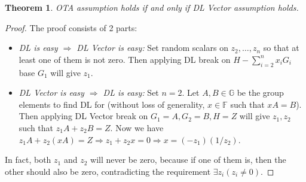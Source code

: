 \documentclass{article}
\newtheorem{theorem}{Theorem}[section]
\begin{document}
\begin{theorem}
OTA assumption holds if and only if DL Vector assumption holds.
\end{theorem}
\begin{proof}
The proof consists of 2 parts:
    \begin{itemize}
    \item \textit{DL is easy $\Rightarrow$ DL Vector is easy:} Set random scalars on $z_2,\ldots,z_n$ so that at least one of them is not zero. Then applying DL break on $H - \sum_{i=2}^{n}{x_i G_i}$ base $G_1$ will give $z_1$.
    \item \textit{DL Vector is easy $\Rightarrow$ DL is easy:} Set $n=2$. Let $A, B\in\mathbb{G}$ be the group elements to find DL for (without loss of generality, $x\in\mathbb{F}$ such that $xA=B$). Then applying DL Vector break on $G_1=A, G_2=B, H=Z$ will give $z_1, z_2$ such that $z_1 A + z_2 B = Z$. Now we have $z_1 A + z_2 (xA) = Z \Rightarrow z_1 + z_2 x = 0 \Rightarrow x = (-z_1)(1/z_2)$.
    \end{itemize}
In fact, both $z_1$ and $z_2$ will never be zero, because if one of them is, then the other should also be zero, contradicting the requirement $\exists z_i(z_i \neq 0)$.
\end{proof}
%
%
\end{document}
